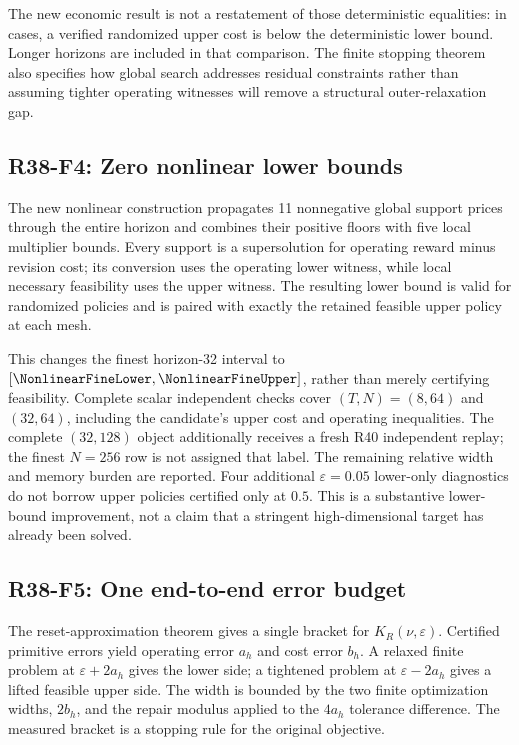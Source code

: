 The new economic result is not a restatement of those deterministic equalities: in \PrimaryStrict{} cases, a verified randomized upper cost is below the deterministic lower bound. Longer horizons are included in that comparison. The finite stopping theorem also specifies how global search addresses residual constraints rather than assuming tighter operating witnesses will remove a structural outer-relaxation gap.

\subsection{R38-F4: Zero nonlinear lower bounds}
The new nonlinear construction propagates 11 nonnegative global support prices through the entire horizon and combines their positive floors with five local multiplier bounds. Every support is a supersolution for operating reward minus revision cost; its conversion uses the operating lower witness, while local necessary feasibility uses the upper witness. The resulting lower bound is valid for randomized policies and is paired with exactly the retained feasible upper policy at each mesh.

This changes the finest horizon-32 interval to $[\NonlinearFineLower,\NonlinearFineUpper]$, rather than merely certifying feasibility. Complete scalar independent checks cover $(T,N)=(8,64)$ and $(32,64)$, including the candidate's upper cost and operating inequalities. The complete $(32,128)$ object additionally receives a fresh R40 independent replay; the finest $N=256$ row is not assigned that label. The remaining relative width and memory burden are reported. Four additional $\varepsilon=0.05$ lower-only diagnostics do not borrow upper policies certified only at $0.5$. This is a substantive lower-bound improvement, not a claim that a stringent high-dimensional target has already been solved.

\subsection{R38-F5: One end-to-end error budget}
The reset-approximation theorem gives a single bracket for $K_R(\nu,\varepsilon)$. Certified primitive errors yield operating error $a_h$ and cost error $b_h$. A relaxed finite problem at $\varepsilon+2a_h$ gives the lower side; a tightened problem at $\varepsilon-2a_h$ gives a lifted feasible upper side. The width is bounded by the two finite optimization widths, $2b_h$, and the repair modulus applied to the $4a_h$ tolerance difference. The measured bracket is a stopping rule for the original objective.


